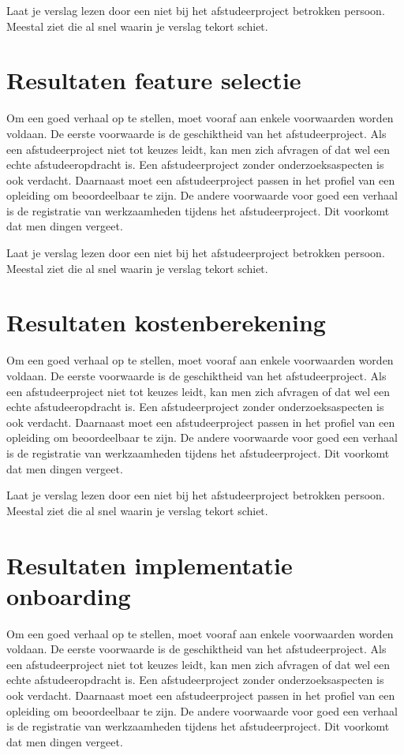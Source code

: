 		
		Laat je verslag lezen door een niet bij het afstudeerproject betrokken
		persoon. Meestal ziet die al snel waarin je verslag tekort schiet.
		\section{Resultaten feature selectie}
		Om een goed verhaal op te stellen, moet vooraf aan enkele voorwaarden
		worden voldaan. De eerste voorwaarde is de geschiktheid van het
		afstudeerproject. Als een afstudeerproject niet tot keuzes leidt, kan
		men zich afvragen of dat wel een echte afstudeeropdracht is. Een
		afstudeerproject zonder onderzoeksaspecten is ook verdacht. Daarnaast
		moet een afstudeerproject passen in het profiel van een opleiding om
		beoordeelbaar te zijn. De andere voorwaarde voor goed een verhaal is
		de registratie van werkzaamheden tijdens het afstudeerproject. Dit
		voorkomt dat men dingen vergeet.
		
		
		Laat je verslag lezen door een niet bij het afstudeerproject betrokken
		persoon. Meestal ziet die al snel waarin je verslag tekort schiet.
		\section{Resultaten kostenberekening}
		Om een goed verhaal op te stellen, moet vooraf aan enkele voorwaarden
		worden voldaan. De eerste voorwaarde is de geschiktheid van het
		afstudeerproject. Als een afstudeerproject niet tot keuzes leidt, kan
		men zich afvragen of dat wel een echte afstudeeropdracht is. Een
		afstudeerproject zonder onderzoeksaspecten is ook verdacht. Daarnaast
		moet een afstudeerproject passen in het profiel van een opleiding om
		beoordeelbaar te zijn. De andere voorwaarde voor goed een verhaal is
		de registratie van werkzaamheden tijdens het afstudeerproject. Dit
		voorkomt dat men dingen vergeet.
		
		
		Laat je verslag lezen door een niet bij het afstudeerproject betrokken
		persoon. Meestal ziet die al snel waarin je verslag tekort schiet.
		\section{Resultaten implementatie onboarding}
		Om een goed verhaal op te stellen, moet vooraf aan enkele voorwaarden
		worden voldaan. De eerste voorwaarde is de geschiktheid van het
		afstudeerproject. Als een afstudeerproject niet tot keuzes leidt, kan
		men zich afvragen of dat wel een echte afstudeeropdracht is. Een
		afstudeerproject zonder onderzoeksaspecten is ook verdacht. Daarnaast
		moet een afstudeerproject passen in het profiel van een opleiding om
		beoordeelbaar te zijn. De andere voorwaarde voor goed een verhaal is
		de registratie van werkzaamheden tijdens het afstudeerproject. Dit
		voorkomt dat men dingen vergeet.
		
